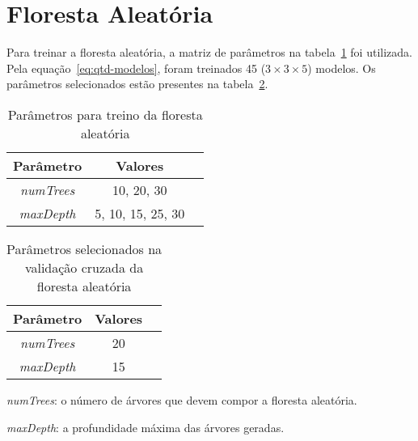 \section{Floresta Aleatória}
\label{sec:rf}

Para treinar a floresta aleatória, a matriz de parâmetros na tabela~\ref{tab:param-rf} foi utilizada.
Pela equação~\ref{eq:qtd-modelos}, foram treinados 45 ($3 \times 3 \times 5$) modelos.
Os parâmetros selecionados estão presentes na tabela~\ref{tab:param-final-rf}.

\begin{table}[h]
    \centering
    \begin{tabular}{|c|c|c|}
        \hline
        Parâmetro         & Valores           \\ \hline
        \textit{numTrees} & 10, 20, 30        \\
        \textit{maxDepth} & 5, 10, 15, 25, 30 \\ \hline
    \end{tabular}
    \caption{Parâmetros para treino da floresta aleatória}
    \label{tab:param-rf}
\end{table}

\begin{table}[h]
    \centering
    \begin{tabular}{|c|c|c|}
        \hline
        Parâmetro         & Valores \\ \hline
        \textit{numTrees} & 20      \\
        \textit{maxDepth} & 15      \\ \hline
    \end{tabular}
    \caption{Parâmetros selecionados na validação cruzada da floresta aleatória}
    \label{tab:param-final-rf}
\end{table}

\textit{numTrees}: o número de árvores que devem compor a floresta aleatória.

\textit{maxDepth}: a profundidade máxima das árvores geradas.
